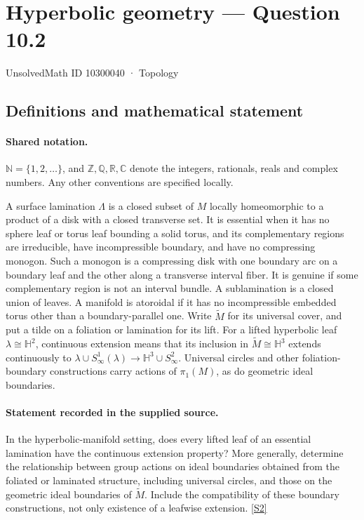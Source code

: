 \documentclass[11pt]{article}
\newcommand{\sref}[2]{\hyperlink{source:#1:#2}{[S#2]}}
\begin{document}
\setcounter{section}{10300039}
\section{Hyperbolic geometry — Question 10.2}\label{10300040}
{\small\sffamily UnsolvedMath ID 10300040 · Topology}
\subsection{Definitions and mathematical statement}

\paragraph{Shared notation.}$\mathbb N=\{1,2,\ldots\}$, and $\mathbb Z,\mathbb Q,\mathbb R,\mathbb C$ denote the integers, rationals, reals and complex numbers. Any other conventions are specified locally.


A surface lamination $\Lambda$ is a closed subset of $M$ locally homeomorphic to a product of a disk with a closed transverse set. It is essential when it has no sphere leaf or torus leaf bounding a solid torus, and its complementary regions are irreducible, have incompressible boundary, and have no compressing monogon. Such a monogon is a compressing disk with one boundary arc on a boundary leaf and the other along a transverse interval fiber. It is genuine if some complementary region is not an interval bundle. A sublamination is a closed union of leaves. A manifold is atoroidal if it has no incompressible embedded torus other than a boundary-parallel one. Write $\widetilde M$ for its universal cover, and put a tilde on a foliation or lamination for its lift. For a lifted hyperbolic leaf $\lambda\cong\mathbb H^2$, continuous extension means that its inclusion in $\widetilde M\cong\mathbb H^3$ extends continuously to $\lambda\cup S^1_\infty(\lambda)\to\mathbb H^3\cup S^2_\infty$. Universal circles and other foliation-boundary constructions carry actions of $\pi_1(M)$, as do geometric ideal boundaries.
\paragraph{Statement recorded in the supplied source.}
In the hyperbolic-manifold setting, does every lifted leaf of an essential lamination have the continuous extension property? More generally, determine the relationship between group actions on ideal boundaries obtained from the foliated or laminated structure, including universal circles, and those on the geometric ideal boundaries of $\widetilde M$. Include the compatibility of these boundary constructions, not only existence of a leafwise extension. \sref{10300040}{2}
\end{document}

